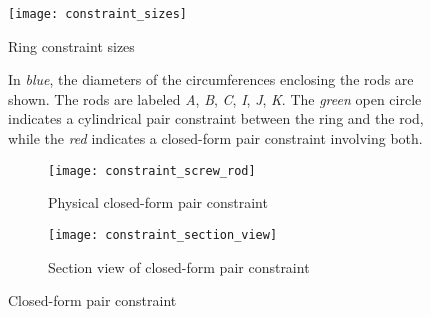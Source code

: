 \begin{figure}
    \centering
    \texttt{[image: constraint\_sizes]}
    \caption{Ring constraint sizes}
    \label{fig:cons_sizes}
    \caption*{In \textit{blue}, the diameters of the circumferences enclosing the rods are shown. The rods are labeled \textit{A}, \textit{B}, \textit{C}, \textit{I}, \textit{J}, \textit{K}. The \textit{green} open circle indicates a cylindrical pair constraint between the ring and the rod, while the \textit{red} indicates a closed-form pair constraint involving both.}
\end{figure}

\begin{figure}
    \centering
    \begin{subfigure}[t]{0.45\textwidth}
        \texttt{[image: constraint\_screw\_rod]}
        \caption{Physical closed-form pair constraint}
        \label{fig:cons_physical}
    \end{subfigure}
    \begin{subfigure}[t]{0.45\textwidth}
        \texttt{[image: constraint\_section\_view]}
        \caption{Section view of closed-form pair constraint}
        \label{fig:cons_physical_section}
    \end{subfigure}
    \caption{Closed-form pair constraint}
    \label{closed_constraint}
\end{figure}
